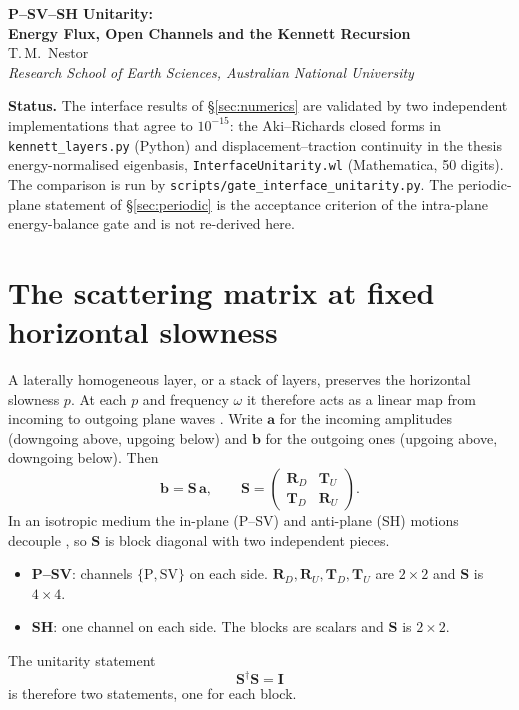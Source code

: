 \documentclass[11pt,a4paper]{article}
\newcommand{\bI}{\mathbf{I}}
\newcommand{\bT}{\mathbf{T}}
\newcommand{\bS}{\mathbf{S}}
\newcommand{\bR}{\mathbf{R}}
\newcommand{\ba}{\mathbf{a}}
\newcommand{\bb}{\mathbf{b}}
\newcommand{\RD}{\bR_{D}}
\newcommand{\RU}{\bR_{U}}
\newcommand{\TD}{\bT_{D}}
\newcommand{\TU}{\bT_{U}}
\newcommand{\herm}{^{\dagger}}
\begin{document}
\thispagestyle{plain}
\begin{center}
\vspace*{1em}
{\LARGE\bfseries P--SV--SH Unitarity:\\[0.3em]
Energy Flux, Open Channels and the Kennett Recursion}\\[1.8em]
{\large T.\,M.\ Nestor}\\[0.5em]
{\itshape Research School of Earth Sciences, Australian National University}\\[2em]
\end{center}

\noindent\textbf{Status.} The interface results of \S\ref{sec:numerics}
are validated by two independent implementations that agree to
$10^{-15}$: the Aki--Richards closed forms in \texttt{kennett\_layers.py}
(Python) and displacement--traction continuity in the thesis
energy-normalised eigenbasis, \texttt{InterfaceUnitarity.wl}
(Mathematica, 50 digits). The comparison is run by
\texttt{scripts/gate\_interface\_unitarity.py}. The periodic-plane
statement of \S\ref{sec:periodic} is the acceptance criterion of the
intra-plane energy-balance gate and is not re-derived here.

\section{The scattering matrix at fixed horizontal slowness}
\label{sec:smatrix}

A laterally homogeneous layer, or a stack of layers, preserves the
horizontal slowness $p$. At each $p$ and frequency $\omega$ it therefore
acts as a linear map from incoming to outgoing plane waves
\citep{Kennett1983,KennettKerry1979}. Write $\ba$ for the incoming
amplitudes (downgoing above, upgoing below) and $\bb$ for the outgoing
ones (upgoing above, downgoing below). Then
\begin{equation}
  \bb = \bS\,\ba,
  \qquad
  \bS =
  \begin{pmatrix}
    \RD & \TU \\
    \TD & \RU
  \end{pmatrix}.
  \label{eq:smatrix}
\end{equation}
In an isotropic medium the in-plane (P--SV) and anti-plane (SH) motions
decouple \citep[ch.~5]{AkiRichards2002}, so $\bS$ is block diagonal
with two independent pieces.
\begin{itemize}
\item \textbf{P--SV}: channels $\{\mathrm{P},\mathrm{SV}\}$ on each
  side. $\RD, \RU, \TD, \TU$ are $2\times2$ and $\bS$ is $4\times4$.
\item \textbf{SH}: one channel on each side. The blocks are scalars
  and $\bS$ is $2\times2$.
\end{itemize}
The unitarity statement
\begin{equation}
  \bS\herm \bS = \bI
  \label{eq:unitary}
\end{equation}
is therefore two statements, one for each block.
\end{document}

